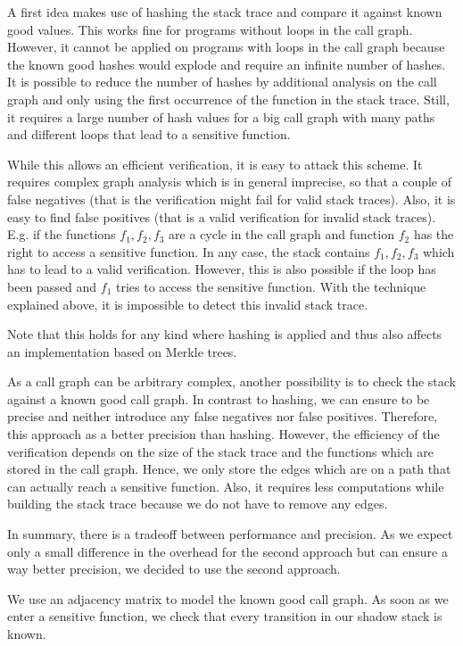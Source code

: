 \documentclass{llncs}
\begin{document}
A first idea makes use of hashing the stack trace and compare it against known good values. This works fine for programs without loops in the call graph. However, it cannot be applied on programs with loops in the call graph because the known good hashes would explode and require an infinite number of hashes. It is possible to reduce the number of hashes by additional analysis on the call graph and only using the first occurrence of the function in the stack trace. Still, it requires a large number of hash values for a big call graph with many paths and different loops that lead to a sensitive function.

While this allows an efficient verification, it is easy to attack this scheme. It requires complex graph analysis which is in general imprecise, so that a couple of false negatives (that is the verification might fail for valid stack traces). Also, it is easy to find false positives (that is a valid verification for invalid stack traces). E.g. if the functions $f_1, f_2, f_3$ are a cycle in the call graph and function $f_2$ has the right to access a sensitive function. In any case, the stack contains $f_1, f_2, f_3$ which has to lead to a valid verification. However, this is also possible if the loop has been passed and $f_1$ tries to access the sensitive function. With the technique explained above, it is impossible to detect this invalid stack trace.

Note that this holds for any kind where hashing is applied and thus also affects an implementation based on Merkle trees.

As a call graph can be arbitrary complex, another possibility is to check the stack against a known good call graph. In contrast to hashing, we can ensure to be precise and neither introduce any false negatives nor false positives. Therefore, this approach as a better precision than hashing. However, the efficiency of the verification depends on the size of the stack trace and the functions which are stored in the call graph. Hence, we only store the edges which are on a path that can actually reach a sensitive function. Also, it requires less computations while building the stack trace because we do not have to remove any edges.

In summary, there is a tradeoff between performance and precision. As we expect only a small difference in the overhead for the second approach but can ensure a way better precision, we decided to use the second approach.

We use an adjacency matrix to model the known good call graph. As soon as we enter a sensitive function, we check that every transition in our shadow stack is known.
\end{document}
